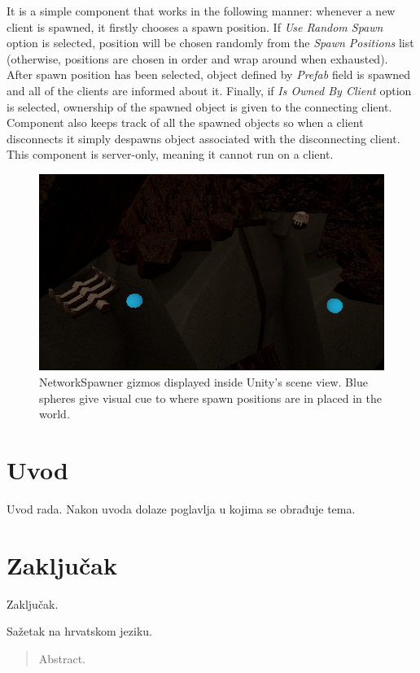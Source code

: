\documentclass[times, utf8, diplomski]{fer}
\begin{document}
It is a simple component that works in the following manner: whenever a new client is spawned, it firstly chooses a spawn position. If \textit{Use Random Spawn} option is selected, position will be chosen randomly from the \textit{Spawn Positions} list (otherwise, positions are chosen in order and wrap around when exhausted). \\

After spawn position has been selected, object defined by \textit{Prefab} field is spawned and all of the clients are informed about it. Finally, if \textit{Is Owned By Client} option is selected, ownership of the spawned object is given to the connecting client. \\

Component also keeps track of all the spawned objects so when a client disconnects it simply despawns object associated with the disconnecting client. This component is server-only, meaning it cannot run on a client.

\begin{figure}[H]
	\centering
	\includegraphics[scale=0.65]{NetworkSpawner-example}
	\caption{NetworkSpawner gizmos displayed inside Unity's scene view. Blue spheres give visual cue to where spawn positions are in placed in the world.}
\end{figure}

\chapter{Uvod}
Uvod rada. Nakon uvoda dolaze poglavlja u kojima se obrađuje tema.

\chapter{Zaključak}
Zaključak.




\begin{sazetak}
Sažetak na hrvatskom jeziku.

\end{sazetak}

\begin{abstract}
Abstract.

\end{abstract}
\end{document}

